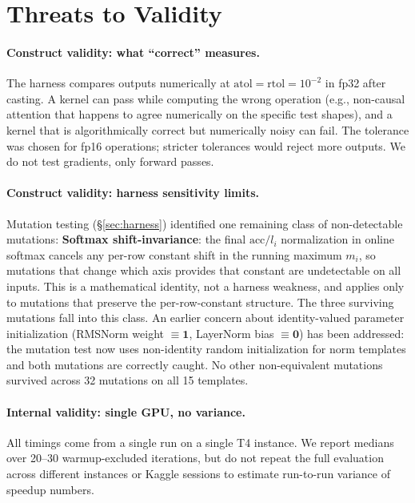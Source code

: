 \documentclass[11pt]{article}
\begin{document}
\section{Threats to Validity}
\label{sec:threats}

\paragraph{Construct validity: what ``correct'' measures.}
The harness compares outputs numerically at $\mathrm{atol}=\mathrm{rtol}=10^{-2}$ in fp32 after casting.
A kernel can pass while computing the wrong operation (e.g., non-causal attention that happens to
agree numerically on the specific test shapes), and a kernel that is algorithmically correct but
numerically noisy can fail. The tolerance was chosen for fp16 operations; stricter tolerances
would reject more outputs. We do not test gradients, only forward passes.

\paragraph{Construct validity: harness sensitivity limits.}
Mutation testing (\S\ref{sec:harness}) identified one remaining class of non-detectable
mutations: \textbf{Softmax shift-invariance}: the final $\mathrm{acc}/l_i$ normalization in
online softmax cancels any per-row constant shift in the running maximum $m_i$, so mutations
that change which axis provides that constant are undetectable on all inputs. This is a
mathematical identity, not a harness weakness, and applies only to mutations that preserve
the per-row-constant structure. The three surviving mutations fall into this class.
An earlier concern about identity-valued parameter initialization
(RMSNorm weight $\equiv\mathbf{1}$, LayerNorm bias $\equiv\mathbf{0}$) has been addressed:
the mutation test now uses non-identity random initialization for norm templates and both
mutations are correctly caught. No other non-equivalent mutations survived across 32
mutations on all 15 templates.

\paragraph{Internal validity: single GPU, no variance.}
All timings come from a single run on a single T4 instance. We report medians over 20--30 warmup-excluded
iterations, but do not repeat the full evaluation across different instances or Kaggle sessions to
estimate run-to-run variance of speedup numbers.
\end{document}
